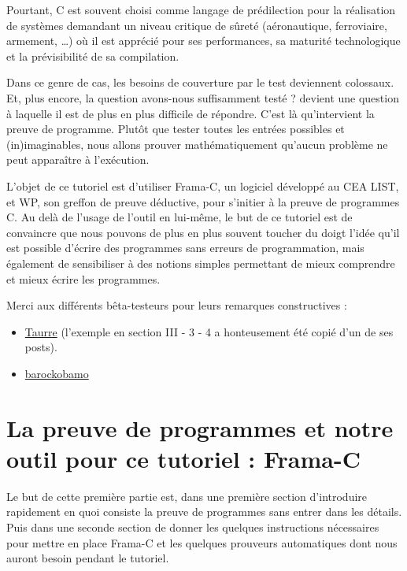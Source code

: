 \documentclass[12pt,francais,]{scrbook}
\newenvironment{zdsblock}[1]{%
  \tcolorbox[beamer,%
    noparskip,breakable,
    colback=LightBlue,colframe=DarkBlue,%
    colbacklower=DarkBlue,%
    title=#1]
}{\endtcolorbox}
\begin{document}
Pourtant, C est souvent choisi comme langage de prédilection pour la
réalisation de systèmes demandant un niveau critique de sûreté
(aéronautique, ferroviaire, armement, \ldots{}) où il est apprécié pour
ses performances, sa maturité technologique et la prévisibilité de sa
compilation.

Dans ce genre de cas, les besoins de couverture par le test deviennent
colossaux. Et, plus encore, la question \og{}avons-nous suffisamment testé
?\fg{} devient une question à laquelle il est de plus en plus difficile de
répondre. C'est là qu'intervient la preuve de programme. Plutôt que
tester toutes les entrées possibles et (in)imaginables, nous allons
prouver \og{}mathématiquement\fg{} qu'aucun problème ne peut apparaître à
l'exécution.

L'objet de ce tutoriel est d'utiliser Frama-C, un logiciel développé au
CEA LIST, et WP, son greffon de preuve déductive, pour s'initier à la
preuve de programmes C. Au delà de l'usage de l'outil en lui-même, le
but de ce tutoriel est de convaincre que nous pouvons de plus en plus
souvent toucher du doigt l'idée qu'il est possible d'écrire des
programmes sans erreurs de programmation, mais également de sensibiliser
à des notions simples permettant de mieux comprendre et mieux écrire les
programmes.

\begin{zdsblock}{Information}
  Merci aux différents bêta-testeurs
  pour leurs remarques constructives :
  \begin{itemize}
  \item \href{https://zestedesavoir.com/membres/voir/Taurre/}{Taurre} (l'exemple
    en section III - 3 - 4 a honteusement été copié d'un de ses
    posts).
  \item \href{https://zestedesavoir.com/membres/voir/barockobamo/}{barockobamo}
  \end{itemize}
\end{zdsblock}
  
\chapter{La preuve de programmes et notre outil pour ce tutoriel :
Frama-C}\label{la-preuve-de-programmes-et-notre-outil-pour-ce-tutoriel-frama-c}

Le but de cette première partie est, dans une première section
d'introduire rapidement en quoi consiste la preuve de programmes sans
entrer dans les détails. Puis dans une seconde section de donner les
quelques instructions nécessaires pour mettre en place Frama-C et les
quelques prouveurs automatiques dont nous auront besoin pendant le
tutoriel.
\end{document}
